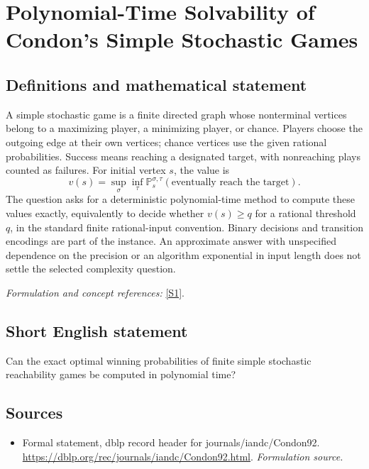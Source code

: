 \documentclass[11pt]{article}
\begin{document}
\section*{\texorpdfstring{Polynomial-Time Solvability of Condon's Simple Stochastic Games}{Polynomial-Time Solvability of Condon's Simple Stochastic Games}}\label{478}
\subsection{Definitions and mathematical statement}
A simple stochastic game is a finite directed graph whose nonterminal vertices belong to a maximizing player, a minimizing player, or chance. Players choose the outgoing edge at their own vertices; chance vertices use the given rational probabilities. Success means reaching a designated target, with nonreaching plays counted as failures. For initial vertex $s$, the value is
\[
 v(s)=\sup_\sigma\inf_\tau
 {\mathbb{P}}_s^{\sigma,\tau}(\text{eventually reach the target}).
\]
The question asks for a deterministic polynomial-time method to compute these values exactly, equivalently to decide whether $v(s)\ge q$ for a rational threshold $q$, in the standard finite rational-input convention. Binary decisions and transition encodings are part of the instance. An approximate answer with unspecified dependence on the precision or an algorithm exponential in input length does not settle the selected complexity question.
\par\smallskip\textit{Formulation and concept references:} \href{https://dblp.org/rec/journals/iandc/Condon92.html}{[S1]}.

\subsection{Short English statement}
Can the exact optimal winning probabilities of finite simple stochastic reachability games be computed in polynomial time?
\subsection{Sources}
\begin{itemize}
\item[S1]Formal statement, dblp record header for journals/iandc/Condon92.
\url{https://dblp.org/rec/journals/iandc/Condon92.html}.
\textit{Formulation source.}
\end{itemize}
\end{document}
